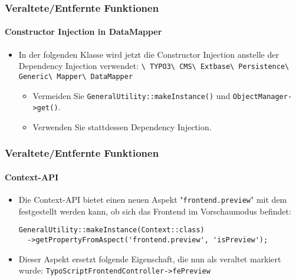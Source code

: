 \begin{frame}[fragile]
	\frametitle{Veraltete/Entfernte Funktionen}
	\framesubtitle{Constructor Injection in DataMapper}

	\begin{itemize}

		\item In der folgenden Klasse wird jetzt die Constructor Injection anstelle der Dependency Injection verwendet:
			\smaller
				\texttt{\textbackslash
					TYPO3\textbackslash
					CMS\textbackslash
					Extbase\textbackslash
					Persistence\textbackslash
					Generic\textbackslash
					Mapper\textbackslash
					DataMapper}
			\normalsize

			\begin{itemize}\smaller
				\item[\ding{228}] Vermeiden Sie \texttt{GeneralUtility::makeInstance()} und \texttt{ObjectManager->get()}.
				\item[\ding{228}] Verwenden Sie stattdessen Dependency Injection.
			\end{itemize}\normalsize

	\end{itemize}

\end{frame}


\begin{frame}[fragile]
	\frametitle{Veraltete/Entfernte Funktionen}
	\framesubtitle{Context-API}

	\lstset{basicstyle=\tiny\ttfamily}

	\begin{itemize}

		\item Die Context-API bietet einen neuen Aspekt "\texttt{frontend.preview}"
			mit dem festgestellt werden kann, ob sich das Frontend im Vorschaumodus befindet:

\begin{lstlisting}
GeneralUtility::makeInstance(Context::class)
  ->getPropertyFromAspect('frontend.preview', 'isPreview');
\end{lstlisting}

		\item Dieser Aspekt ersetzt folgende Eigenschaft, die nun als veraltet markiert wurde:
			\small\texttt{TypoScriptFrontendController->fePreview}\normalsize

	\end{itemize}

\end{frame}

